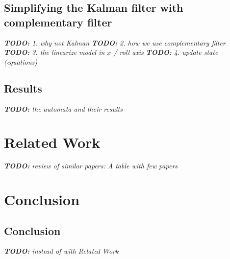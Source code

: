 \documentclass[notes]{beamer}
\newcommand\todoil[1]{ {\color{red}\textit{\textbf{TODO:} #1}} }
\begin{document}
\subsection{Simplifying the Kalman filter with complementary filter}
    \todoil{1. why not Kalman}
    \todoil{2. how we use complementary filter}
    \todoil{3. the linearize model in $x$ / roll axis}
    \todoil{4. update state (equations)}
\subsection{Results}
    \todoil{the automata and their results}

\section{Related Work}
    \todoil{review of similar papers: A table with few papers}

\section{Conclusion}
\subsection{Conclusion}
    \todoil{instead of with Related Work}
\end{document}
